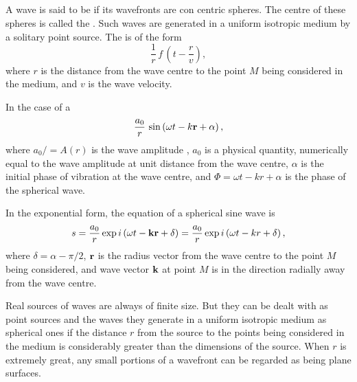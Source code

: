 \subsection{}\label{30.2.8} A wave is said to be  if its wavefronts are con­ centric spheres. The centre of these spheres is called the . Such waves are generated in a uniform isotropic medium by a solitary point source. The  is of the form
\begin{equation*}%
\frac{1}{r} \, f \, \left( t - \frac{r}{v}\right),
\end{equation*}
where $r$ is the distance from the wave centre to the point $M$ being considered in the medium, and $v$ is the wave velocity.

In the case of a 
\begin{equation*}%
\frac{a_{0}}{r} \, \sin \left( \omega t - k \vb{r} + \alpha \right),
\end{equation*}
where $ a_{0}/ = A (r)$ is the wave amplitude , $a_{0}$ is a physical quantity, numerically equal to the wave amplitude at unit distance from the wave centre, $\alpha$ is the initial phase of vibration at the wave centre, and $\Phi = \omega t  - kr + \alpha$ is the phase of the spherical wave.

In the exponential form, the equation of a spherical sine wave is
\begin{equation*}%
s = \frac{a_{0}}{r} \exp i \left( \omega t - \vb{k}\vb{r} + \delta \right) = \frac{a_{0}}{r} \exp i \left( \omega t - kr + \delta \right),
\end{equation*}
where $\delta = \alpha - \pi/2$, $\vb{r}$ is the radius vector from the wave centre to the point $M$ being considered, and wave vector $\vb{k}$ at point $M$ is in the direction radially away from the wave centre.

Real sources of waves are always of finite size. But they can be dealt with as point sources and the waves they generate in a uniform isotropic medium as spherical ones if the distance $r$ from the source to the points being considered in the medium is considerably greater than the dimensions of the source. When $r$ is extremely great, any small portions of a wavefront can be regarded as being plane surfaces.

